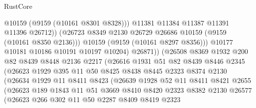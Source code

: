 \begin{lexlean}{RustCore}
\begin{coremodule}
                                @10159
                                (@9159 (@10161 @8301 @8328)))
                              @11381
                              @11384
                              @11387
                              @11391
                              @11396
                              @26712))
                          (@26723 @8349 @2130 @26729 @26686 @10159 (@9159 (@10161 @8350 @2136)))
                          @10159
                          (@9159 (@10161 @8297 @8356)))
                        @10177
                        @10181
                        @10186
                        @10191
                        @10197
                        @10204)
                      @26871))
                  (@26508
                    @8369
                    @1932
                    @200
                    @82
                    @8439
                    @8448
                    @2136
                    @2217
                    (@26616
                      @1931
                      @51
                      @82
                      @8439
                      @8446
                      @2345
                      (@26623
                        @1929
                        @395
                        @11
                        @50
                        @8425
                        @8438
                        @8445
                        @2323
                        @8374
                        @2130
                        (@26634
                          @1929
                          @11
                          @8411
                          @8423
                          (@26639
                            @1928
                            @52
                            @11
                            @8411
                            @8421
                            @2655
                            (@26623
                              @189
                              @1843
                              @11
                              @51
                              @3669
                              @8410
                              @8420
                              @2323
                              @8382
                              @2130
                              @26577
                              (@26623
                                @266
                                @302
                                @11
                                @50
                                @2287
                                @8409
                                @8419
                                @2323

\end{coremodule}
\end{lexlean}
